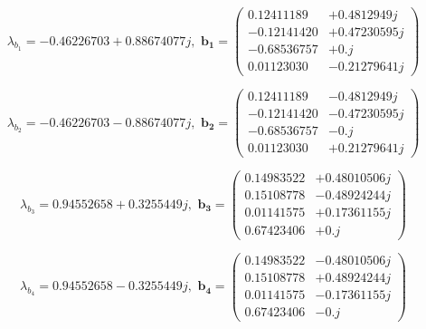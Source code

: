 \documentclass{jsarticle}
\begin{document}
\begin{equation*}
	\lambda_{b_{1}} = -0.46226703+0.88674077j, \,\,
		\bm{b_{1}} = \left(
		    \begin{alignedat}{1}
		      0.12411189&+0.4812949j\\
		      -0.12141420&+0.47230595j\\
		      -0.68536757&+0.j\\
		      0.01123030&-0.21279641j
		    \end{alignedat}
		  \right)
\end{equation*}

\begin{equation*}
	\lambda_{b_{2}} = -0.46226703-0.88674077j, \,\,
		\bm{b_{2}} = \left(
		    \begin{alignedat}{1}
		      0.12411189&-0.4812949j\\
		      -0.12141420&-0.47230595j\\
		      -0.68536757&-0.j\\
		      0.01123030&+0.21279641j
		    \end{alignedat}
		  \right)
\end{equation*}

\begin{equation*}
	\lambda_{b_{3}} = 0.94552658+0.3255449j, \,\,
		\bm{b_{3}} = \left(
		    \begin{alignedat}{1}
		      0.14983522&+0.48010506j\\
		      0.15108778&-0.48924244j\\
		      0.01141575&+0.17361155j\\
		      0.67423406&+0.j
		    \end{alignedat}
		  \right)
\end{equation*}

\begin{equation*}
	\lambda_{b_{4}} = 0.94552658-0.3255449j, \,\,
		\bm{b_{4}} = \left(
		    \begin{alignedat}{1}
		      0.14983522&-0.48010506j\\
		      0.15108778&+0.48924244j\\
		      0.01141575&-0.17361155j\\
		      0.67423406&-0.j 
		    \end{alignedat}
		  \right)
\end{equation*}
\end{document}

